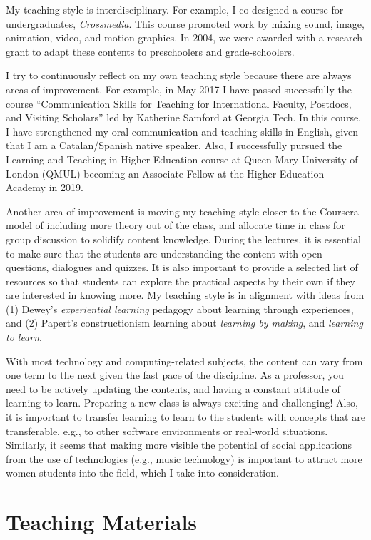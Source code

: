\documentclass[10pt, a4paper]{article}
\begin{document}
My teaching style is interdisciplinary. For example, I co-designed a course for undergraduates, \emph{Crossmedia}. This course promoted work by mixing sound, image, animation, video, and motion graphics. In 2004, we were awarded with a research grant to adapt these contents to preschoolers and grade-schoolers.

I try to continuously reflect on my own teaching style because there are always areas of improvement. For example, in May 2017 I have passed successfully the course ``Communication Skills for Teaching for International Faculty, Postdocs, and Visiting Scholars'' led by Katherine Samford at Georgia Tech. In this course, I have strengthened my oral communication and teaching skills in English, given that I am a Catalan/Spanish native speaker. Also, I successfully pursued the Learning and Teaching in Higher Education course at Queen Mary University of London (QMUL) becoming an Associate Fellow at the Higher Education Academy in 2019.

Another area of improvement is moving my teaching style closer to the Coursera model of including more theory out of the class, and allocate time in class for group discussion to solidify content knowledge. During the lectures, it is essential to make sure that the students are understanding the content with open questions, dialogues and quizzes. It is also important to provide a selected list of resources so that students can explore the practical aspects by their own if they are interested in knowing more.
My teaching style is in alignment with ideas from (1) Dewey's \emph{experiential learning} pedagogy about learning through experiences, and (2) Papert's constructionism learning about \emph{learning by making}, and \emph{learning to learn}.

With most technology and computing-related subjects, the content can vary from one term to the next given the fast pace of the discipline. As a professor, you need to be actively updating the contents, and having a constant attitude of learning to learn. Preparing a new class is always exciting and challenging! Also, it is important to transfer learning to learn to the students with concepts that are transferable, e.g., to other software environments or real-world situations. Similarly, it seems that making more visible the potential of social applications from the use of technologies (e.g., music technology) is important to attract more women students into the field, which I take into consideration.  

\section*{Teaching Materials}
\end{document}
